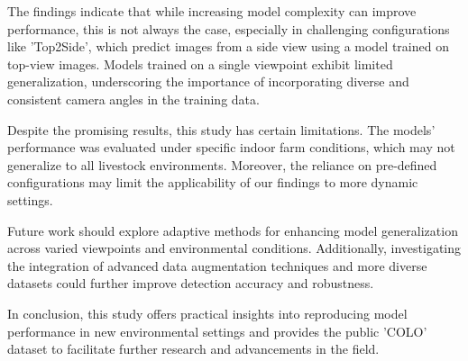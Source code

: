 The findings indicate that while increasing model complexity can improve performance, this is not always the case, especially in challenging configurations like 'Top2Side', which predict images from a side view using a model trained on top-view images. Models trained on a single viewpoint exhibit limited generalization, underscoring the importance of incorporating diverse and consistent camera angles in the training data.

Despite the promising results, this study has certain limitations. The models' performance was evaluated under specific indoor farm conditions, which may not generalize to all livestock environments. Moreover, the reliance on pre-defined configurations may limit the applicability of our findings to more dynamic settings.

Future work should explore adaptive methods for enhancing model generalization across varied viewpoints and environmental conditions. Additionally, investigating the integration of advanced data augmentation techniques and more diverse datasets could further improve detection accuracy and robustness.

In conclusion, this study offers practical insights into reproducing model performance in new environmental settings and provides the public 'COLO' dataset to facilitate further research and advancements in the field.